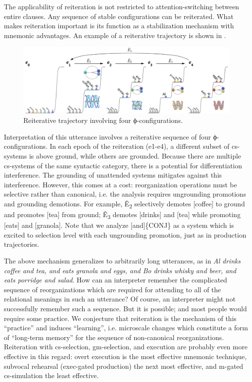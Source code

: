   The applicability of reiteration is not restricted to attention-switching between entire clauses. Any sequence of stable configurations can be reiterated. What makes reiteration important is its function as a stabilization mechanism with mnemonic advantages. An example of a reiterative trajectory is shown in {}.  

\z
  
\begin{figure}
\includegraphics[width=\textwidth]{figures/Tilsen-img123.png}
\caption{Reiterative trajectory involving four ϕ-configurations.}
\label{fig:6:4}
\end{figure}
 

  Interpretation of this utterance involves a reiterative sequence of four ϕ-configurations. In each epoch of the reiteration (e1-e4), a different subset of cs-systems is above ground, while others are grounded. Because there are multiple cs-systems of the same syntactic category, there is a potential for differentiation interference. The grounding of unattended systems mitigates against this interference. However, this comes at a cost: reorganization operations must be selective rather than canonical, i.e. the analysis requires ungrounding promotions and grounding demotions. For example, Ê\textsubscript{2} selectively demotes [coffee] to ground and promotes [tea] from ground; Ê\textsubscript{3} demotes [drinks] and [tea] while promoting [eats] and [granola]. Note that we analyze [and]\{CONJ\} as a system which is excited to selection level with each ungrounding promotion, just as in production trajectories.

  The above mechanism generalizes to arbitrarily long utterances, as in \textit{Al drinks coffee and tea, and eats granola and eggs, and Bo drinks whisky and beer, and eats porridge and salad}. How can an interpreter remember the complicated sequence of reorganizations which are required for attending to all of the relational meanings in such an utterance? Of course, an interpreter might not successfully remember such a sequence. But it is possible; and most people would require some practice. We conjecture that reiteration is the mechanism of this “practice” and induces “learning”, i.e. microscale changes which constitute a form of “long-term memory” for the sequence of non-canonical reorganizations. Reiteration with cs-selection, gm-selection, and execution are probably even more effective in this regard: overt execution is the most effective mnemonic technique, subvocal rehearsal (exec-gated production) the next most effective, and m-gated cs-simulation the least effective.


